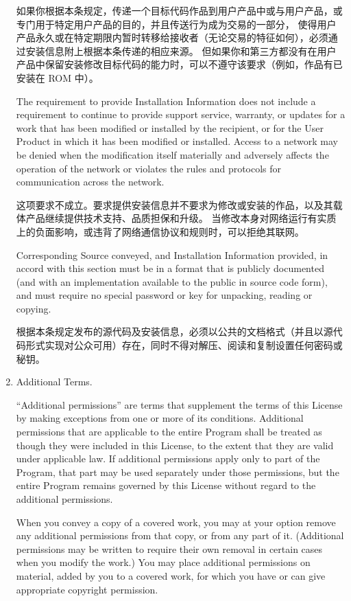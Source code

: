 \documentclass[11pt]{article}
\begin{document}
\begin{enumerate}
如果你根据本条规定，传递一个目标代码作品到用户产品中或与用户产品，或专门用于特定用户产品的目的，并且传送行为成为交易的一部分，
使得用户产品永久或在特定期限内暂时转移给接收者（无论交易的特征如何），必须通过安装信息附上根据本条传递的相应来源。 
但如果你和第三方都没有在用户产品中保留安装修改目标代码的能力时，可以不遵守该要求（例如，作品有已安装在 ROM 中）。

The requirement to provide Installation Information does not include a
requirement to continue to provide support service, warranty, or updates
for a work that has been modified or installed by the recipient, or for
the User Product in which it has been modified or installed.  Access to a
network may be denied when the modification itself materially and
adversely affects the operation of the network or violates the rules and
protocols for communication across the network.

这项要求不成立。要求提供安装信息并不要求为修改或安装的作品，以及其载体产品继续提供技术支持、品质担保和升级。
当修改本身对网络运行有实质上的负面影响，或违背了网络通信协议和规则时，可以拒绝其联网。

Corresponding Source conveyed, and Installation Information provided,
in accord with this section must be in a format that is publicly
documented (and with an implementation available to the public in
source code form), and must require no special password or key for
unpacking, reading or copying.

根据本条规定发布的源代码及安装信息，必须以公共的文档格式（并且以源代码形式实现对公众可用）存在，同时不得对解压、阅读和复制设置任何密码或秘钥。

\item Additional Terms.

``Additional permissions'' are terms that supplement the terms of this
License by making exceptions from one or more of its conditions.
Additional permissions that are applicable to the entire Program shall
be treated as though they were included in this License, to the extent
that they are valid under applicable law.  If additional permissions
apply only to part of the Program, that part may be used separately
under those permissions, but the entire Program remains governed by
this License without regard to the additional permissions.

When you convey a copy of a covered work, you may at your option
remove any additional permissions from that copy, or from any part of
it.  (Additional permissions may be written to require their own
removal in certain cases when you modify the work.)  You may place
additional permissions on material, added by you to a covered work,
for which you have or can give appropriate copyright permission.


\end{enumerate}
\end{document}
